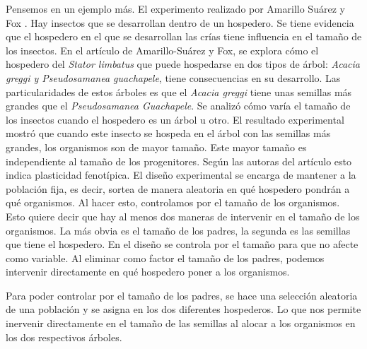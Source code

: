 Pensemos en un ejemplo más. El experimento realizado por Amarillo Suárez y Fox \citeyear{Amarillo-Suarez2006}. Hay insectos que se desarrollan dentro de un hospedero. Se tiene evidencia que el hospedero en el que se desarrollan las crías tiene influencia en el tamaño de los insectos. En el artículo de Amarillo-Suárez y Fox, se explora cómo el hospedero del \emph{Stator limbatus} que puede hospedarse en dos tipos de árbol: \emph{Acacia greggi y Pseudosamanea guachapele}, tiene consecuencias en su desarrollo. Las particularidades de estos árboles es que el \emph{Acacia greggi} tiene unas semillas más grandes que el \emph{Pseudosamanea Guachapele}. Se analizó cómo varía el tamaño de los insectos cuando el hospedero es un árbol u otro. El resultado experimental mostró que cuando este insecto se hospeda en el árbol con las semillas más grandes, los organismos son de mayor tamaño. Este mayor tamaño es independiente al tamaño de los progenitores. Según las autoras del artículo esto indica plasticidad fenotípica. El diseño experimental se encarga de mantener a la población fija, es decir, sortea de manera aleatoria en qué hospedero pondrán a qué organismos. Al hacer esto, controlamos por el tamaño de los organismos. Esto quiere decir que hay al menos dos maneras de intervenir en el tamaño de los organismos. La más obvia es el tamaño de los padres, la segunda es las semillas que tiene el hospedero. En el diseño se controla por el tamaño para que no afecte como variable. Al eliminar como factor el tamaño de los padres, podemos intervenir directamente en qué hospedero poner a los organismos.

\begin{center}
\end{center}


Para poder controlar por el tamaño de los padres, se hace una selección aleatoria de una población y se asigna en los dos diferentes hospederos. Lo que nos permite inervenir directamente en el tamaño de las semillas al alocar a los organismos en los dos respectivos árboles.

\begin{center}
\end{center}

